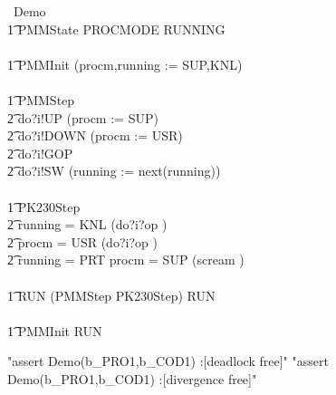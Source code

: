 \begin{circus}
\circprocess\ Demo \circdef \circbegin \\
\t1 \circstate PMMState  PROCMODE \land RUNNING \\
\\
\t1 PMMInit \circdef (procm,running := SUP,KNL) \\
\\
\t1 PMMStep \circdef \\
\t2             do?i!UP \then (procm := SUP) \circseq \Skip \\
\t2 \extchoice  do?i!DOWN \then (procm := USR) \circseq \Skip \\
\t2 \extchoice  do?i!GOP \then \Skip \\
\t2 \extchoice  do?i!SW \then (running := next(running)) \circseq \Skip \\
\\
\t1 PK230Step \circdef \\
\t2 \lcircguard running = KNL \rcircguard \circguard (do?i?op \then \Skip)\\
\t2 \extchoice \lcircguard procm = USR \rcircguard \circguard (do?i?op \then \Skip)\\
\t2 \extchoice \lcircguard running = PRT \land procm = SUP \rcircguard \circguard (scream \then \Stop)\\
\\
\t1 RUN \circdef (PMMStep \interleave PK230Step) \circseq RUN \\
\\
\t1 \circspot PMMInit \circseq RUN \\
\circend
\end{circus}

\begin{assert}
"assert Demo(b_PRO1,b_COD1) :[deadlock free]"
\also
"assert Demo(b_PRO1,b_COD1) :[divergence free]"
\end{assert}
